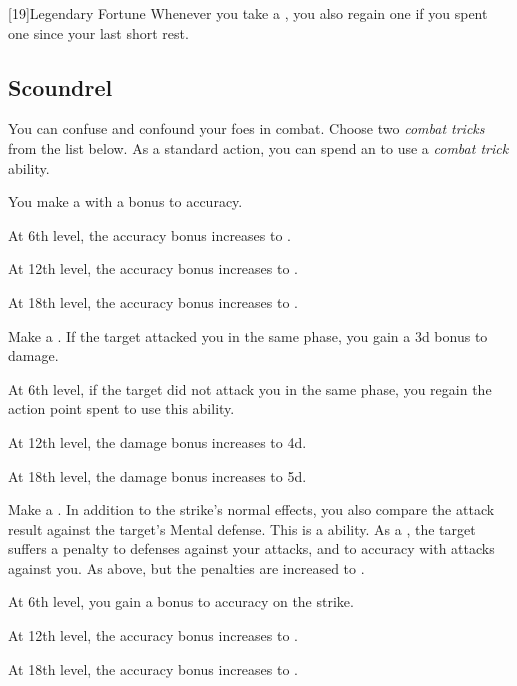         [19]{Legendary Fortune} Whenever you take a , you also regain one  if you spent one since your last short rest.

    \subsection{Scoundrel}

        You can confuse and confound your foes in combat.
        Choose two \textit{combat tricks} from the list below.
        As a standard action, you can spend an  to use a \textit{combat trick} ability.
        {
             You make a  with a  bonus to accuracy.
            \par At 6th level, the accuracy bonus increases to .
            \par At 12th level, the accuracy bonus increases to .
            \par At 18th level, the accuracy bonus increases to .

             Make a .
            If the target attacked you in the same phase, you gain a \plus3d bonus to damage.
            \par At 6th level, if the target did not attack you in the same phase, you regain the action point spent to use this ability.
            \par At 12th level, the damage bonus increases to \plus4d.
            \par At 18th level, the damage bonus increases to \plus5d.

             Make a .
            In addition to the strike's normal effects, you also compare the attack result against the target's Mental defense.
            This is a  ability.
             As a , the target suffers a  penalty to defenses against your attacks, and to accuracy with attacks against you.
             As above, but the penalties are increased to .
            \par At 6th level, you gain a  bonus to accuracy on the strike.
            \par At 12th level, the accuracy bonus increases to .
            \par At 18th level, the accuracy bonus increases to .

}
